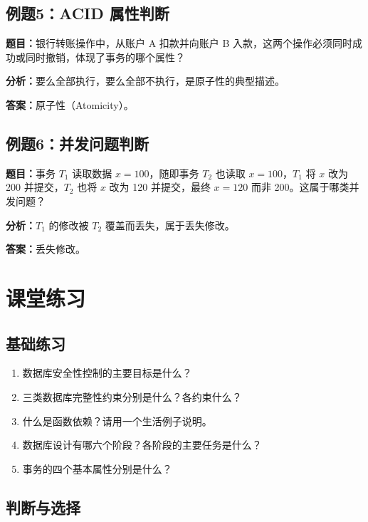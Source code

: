 \documentclass{../../note}
\begin{document}
\subsection{例题5：ACID 属性判断}

\textbf{题目：}银行转账操作中，从账户 A 扣款并向账户 B 入款，这两个操作必须同时成功或同时撤销，体现了事务的哪个属性？

\textbf{分析：}要么全部执行，要么全部不执行，是原子性的典型描述。

\textbf{答案：}原子性（Atomicity）。

\subsection{例题6：并发问题判断}

\textbf{题目：}事务 $T_1$ 读取数据 $x=100$，随即事务 $T_2$ 也读取 $x=100$，$T_1$ 将 $x$ 改为 200 并提交，$T_2$ 也将 $x$ 改为 120 并提交，最终 $x=120$ 而非 200。这属于哪类并发问题？

\textbf{分析：}$T_1$ 的修改被 $T_2$ 覆盖而丢失，属于丢失修改。

\textbf{答案：}丢失修改。

\section{课堂练习}

\subsection{基础练习}

\begin{enumerate}
  \item 数据库安全性控制的主要目标是什么？
  \item 三类数据库完整性约束分别是什么？各约束什么？
  \item 什么是函数依赖？请用一个生活例子说明。
  \item 数据库设计有哪六个阶段？各阶段的主要任务是什么？
  \item 事务的四个基本属性分别是什么？
\end{enumerate}

\subsection{判断与选择}
\end{document}

